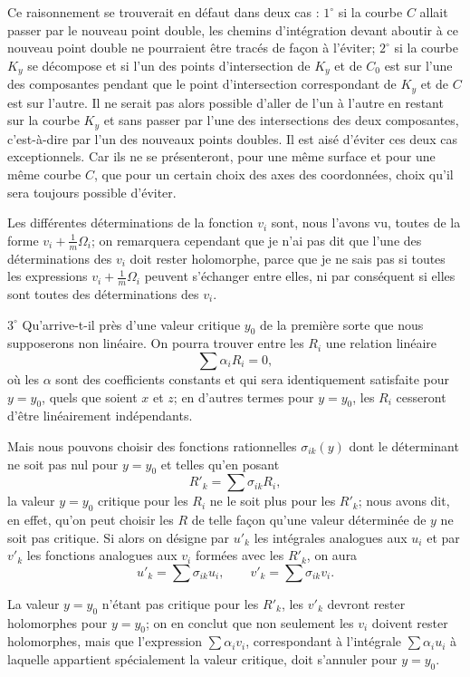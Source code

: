 \documentclass{article}
\begin{document}
Ce raisonnement se trouverait en défaut dans deux cas : $1^\circ$ si la courbe $C$ allait passer par le nouveau point double, les chemins d'intégration devant aboutir à ce nouveau point double ne pourraient être tracés de façon à l'éviter; $2^\circ$ si la courbe $K_{y}$ se décompose et si l'un des points d'intersection de $K_{y}$ et de $C_{0}$ est sur l'une des composantes
pendant que le point d'intersection correspondant de $K_{y}$ et de $C$ est sur l'autre. Il ne serait pas alors possible d'aller de l'un à l'autre en restant sur la courbe $K_{y}$ et sans passer par l'une des intersections des deux composantes, c'est-à-dire par l'un des nouveaux points doubles. Il est aisé d'éviter ces deux cas exceptionnels. Car ils ne se présenteront, pour une même surface et pour une même courbe $C$, que pour un certain choix des axes des coordonnées, choix qu'il sera toujours possible d'éviter.

Les différentes déterminations de la fonction $v_{i}$ sont, nous l'avons vu, toutes de la forme $v_{i} + \frac{1}{m} \Omega_{i}$; on remarquera cependant que je n'ai pas dit que l'une des déterminations des $v_{i}$ doit rester holomorphe, parce que je ne sais pas si toutes les expressions $v_{i} + \frac{1}{m} \Omega_{i}$ peuvent s'échanger entre elles, ni par conséquent si elles sont toutes des déterminations des $v_{i}$.

$3^\circ$ Qu'arrive-t-il près d'une valeur critique $y_{0}$ de la première sorte que nous supposerons non linéaire. On pourra trouver entre les $R_{i}$ une relation linéaire
\[
\sum \alpha_{i} R_{i} = 0,
\]
où les $\alpha$ sont des coefficients constants et qui sera identiquement satisfaite pour $y = y_{0}$, quels que soient $x$ et $z$; en d'autres termes pour $y = y_{0}$, les $R_{i}$ cesseront d'être linéairement indépendants.

Mais nous pouvons choisir des fonctions rationnelles $\sigma_{ik}(y)$ dont le déterminant ne soit pas nul pour $y = y_{0}$ et telles qu'en posant
\[
R'_{k} = \sum \sigma_{ik} R_{i},
\]
la valeur $y = y_{0}$ critique pour les $R_{i}$ ne le soit plus pour les $R'_{k}$; nous avons dit, en effet, qu'on peut choisir les $R$ de telle façon qu'une valeur déterminée de $y$ ne soit pas critique. Si alors on désigne par $u'_{k}$ les intégrales analogues aux $u_{i}$ et par $v'_{k}$ les fonctions analogues aux $v_{i}$ formées avec les $R'_{k}$, on aura
\[
u'_{k} = \sum \sigma_{ik} u_{i}, \qquad v'_{k} = \sum \sigma_{ik} v_{i}.
\]

La valeur $y = y_{0}$ n'étant pas critique pour les $R'_{k}$, les $v'_{k}$ devront rester holomorphes pour $y = y_{0}$; on en conclut que non seulement les $v_{i}$ doivent rester holomorphes, mais que l'expression $\displaystyle\sum \alpha_{i} v_{i}$, correspondant à l'intégrale $\displaystyle\sum \alpha_{i} u_{i}$ à laquelle appartient spécialement la valeur critique, doit s'annuler pour $y = y_{0}$.
\end{document}
